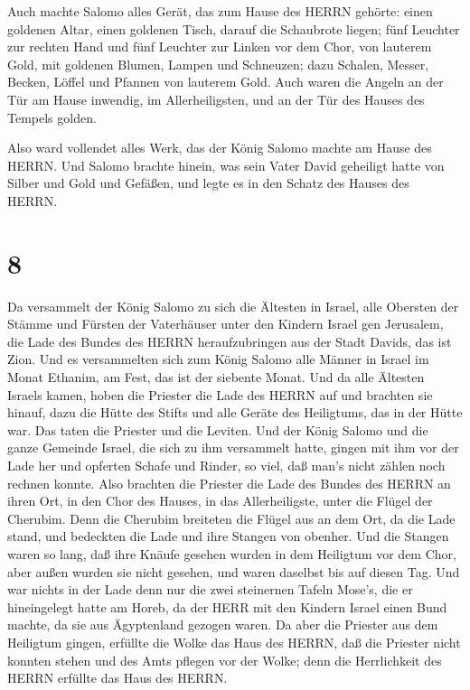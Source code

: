  Auch machte Salomo alles Gerät, das zum Hause des HERRN
gehörte: einen goldenen Altar, einen goldenen Tisch, darauf die
Schaubrote liegen;  fünf Leuchter zur rechten Hand und fünf
Leuchter zur Linken vor dem Chor, von lauterem Gold, mit goldenen
Blumen, Lampen und Schneuzen;  dazu Schalen, Messer,
Becken, Löffel und Pfannen von lauterem Gold. Auch waren die Angeln an
der Tür am Hause inwendig, im Allerheiligsten, und an der Tür des Hauses
des Tempels golden.

 Also ward vollendet alles Werk, das der König Salomo
machte am Hause des HERRN. Und Salomo brachte hinein, was sein Vater
David geheiligt hatte von Silber und Gold und Gefäßen, und legte es in
den Schatz des Hauses des HERRN.

\hypertarget{section-7}{%
\section{8}\label{section-7}}

 Da versammelt der König Salomo zu sich die Ältesten in
Israel, alle Obersten der Stämme und Fürsten der Vaterhäuser unter den
Kindern Israel gen Jerusalem, die Lade des Bundes des HERRN
heraufzubringen aus der Stadt Davids, das ist Zion.  Und es
versammelten sich zum König Salomo alle Männer in Israel im Monat
Ethanim, am Fest, das ist der siebente Monat.  Und da alle
Ältesten Israels kamen, hoben die Priester die Lade des HERRN auf
 und brachten sie hinauf, dazu die Hütte des Stifts und alle
Geräte des Heiligtums, das in der Hütte war. Das taten die Priester und
die Leviten.  Und der König Salomo und die ganze Gemeinde
Israel, die sich zu ihm versammelt hatte, gingen mit ihm vor der Lade
her und opferten Schafe und Rinder, so viel, daß man's nicht zählen noch
rechnen konnte.  Also brachten die Priester die Lade des
Bundes des HERRN an ihren Ort, in den Chor des Hauses, in das
Allerheiligste, unter die Flügel der Cherubim.  Denn die
Cherubim breiteten die Flügel aus an dem Ort, da die Lade stand, und
bedeckten die Lade und ihre Stangen von obenher.  Und die
Stangen waren so lang, daß ihre Knäufe gesehen wurden in dem Heiligtum
vor dem Chor, aber außen wurden sie nicht gesehen, und waren daselbst
bis auf diesen Tag.  Und war nichts in der Lade denn nur die
zwei steinernen Tafeln Mose's, die er hineingelegt hatte am Horeb, da
der HERR mit den Kindern Israel einen Bund machte, da sie aus
Ägyptenland gezogen waren.  Da aber die Priester aus dem
Heiligtum gingen, erfüllte die Wolke das Haus des HERRN, 
daß die Priester nicht konnten stehen und des Amts pflegen vor der
Wolke; denn die Herrlichkeit des HERRN erfüllte das Haus des HERRN.

